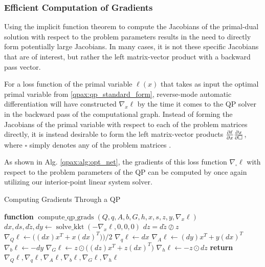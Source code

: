 \subsubsection{Efficient Computation of Gradients}
Using the implicit function theorem to compute the Jacobians of the primal-dual solution with respect to the problem parameters results in the need to directly form potentially large Jacobians. In many cases, it is not these specific Jacobians that are of interest, but rather the left matrix-vector product with a backward pass vector.

For a loss function of the primal variable $\ell(x)$ that takes as input the optimal primal variable from \eqref{qpax:qp_standard_form}, reverse-mode automatic differentiation will have constructed $\nabla_x \ell$ by the time it comes to the QP solver in the backward pass of the computational graph. Instead of forming the Jacobians of the primal variable with respect to each of the problem matrices directly, it is instead desirable to form the
left matrix-vector products $\frac{\partial { \ell }}{ \partial { x }} \frac{\partial { x }}{ \partial { \square }}$,
where $\square$ simply denotes any of the problem matrices \cite{amos2017}.

As shown in Alg. \eqref{qpax:alg:opt_net}, the gradients of this loss function $\nabla_\square \ell$ with respect to the problem parameters of the QP can be computed by once again utilizing our interior-point linear system solver.
\begin{algorithm}
\begin{algorithmic}[1]
    \caption{Computing Gradients Through a QP}\label{qpax:alg:opt_net}
        \State \textbf{function} $\operatorname{compute\_qp\_grads}(Q, q, A, b, G, h, x, s, z, y, \nabla_x \ell)$ %
        \State $dx, ds, d\tilde{z}, dy \gets \operatorname{solve\_kkt}(-\nabla_x \ell, 0, 0, 0)$ 
        \State $dz = d\tilde{z} \oslash z$
        \State $\nabla_Q \ell \gets \big((dx) x^T + x (dx)^T)\big)/2$
        \State $\nabla_q \ell \gets dx$
        \State $\nabla_A \ell \gets (dy)x^T + y (dx)^T$
        \State $\nabla_b \ell \gets -dy$
        \State $\nabla_G \ell \gets z \odot \big((dz)x^T + z(dx)^T\big)$
        \State $\nabla_h \ell \gets -z \odot dz$
    \State \textbf{return} $\nabla_Q \ell, \nabla_q \ell, \nabla_A \ell, \nabla_b \ell, \nabla_G \ell, \nabla_h \ell$
\end{algorithmic}
\end{algorithm}
%
%
%
%
%
%
